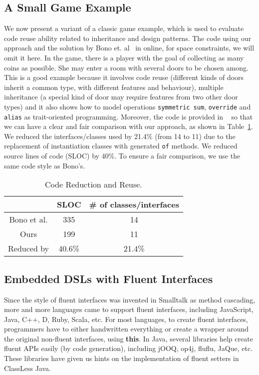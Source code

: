 \subsection{A Small Game Example}
We now present a variant of a classic game example, which is used to
evaluate code reuse ability related to inheritance and design patterns. The code
using our approach and the solution by Bono et. al~\cite{bono14} in online, for
space constraints, we will omit it here. In the game, there is a player with the
goal of collecting as many coins as possible. She may enter a room with several
doors to be chosen among. This is a good example because it involves code reuse
(different kinds of doors inherit a common type, with different features and
behaviour), multiple inheritance (a special kind of door may require features
from two other door types) and it also shows how to model operations
\texttt{symmetric sum}, \texttt{override} and \texttt{alias} as trait-oriented
programming. Moreover, the code is provided in ~\cite{bono14} so that we can
have a clear and fair comparison with our approach, as shown in
Table~\ref{table:codereduction}. We reduced the interfaces/classes used by
21.4\% (from 14 to 11) due to the replacement of instantiation classes with
generated \texttt{of} methods. We reduced source lines of code (SLOC) by
40\%. To ensure a fair comparison, we use the same code style as Bono's.

\begin{table}[h]
\centering
\begin{tabular}{ccc}
\hline
            & SLOC   & \# of classes/interfaces \\ \hline
Bono et al. & 335    & 14                       \\
Ours        & 199    & 11                       \\
\rowcolor[HTML]{C0C0C0} 
Reduced by  & 40.6\% & 21.4\%                   \\ \hline
\end{tabular}
\caption{Code Reduction and Reuse.}
\label{table:codereduction}
\end{table}


\subsection{Embedded DSLs with Fluent Interfaces}
Since the style of fluent interfaces was invented in Smalltalk as method
cascading, more and more languages came to support fluent interfaces, including
JavaScript, Java, C++, D, Ruby, Scala, etc. For most languages, to create fluent
interfaces, programmers have to either handwritten everything or create a
wrapper around the original non-fluent interfaces, using \textbf{this}. In Java,
several libraries help create fluent APIs easily (by code generation), including
jOOQ, op4j, fluflu, JaQue, etc. These libraries have given us hints on the
implementation of fluent setters in ClassLess Java.

